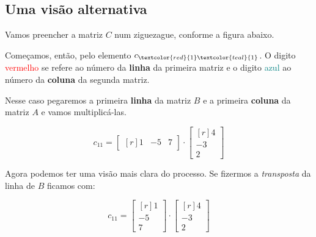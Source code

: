 \subsection{Uma visão alternativa}

Vamos preencher a matriz $C$ num ziguezague, conforme a figura abaixo.

\begin{center}
\end{center}

Começamos, então, pelo elemento $c_{\textcolor{red}{1}\textcolor{teal}{1}}$. O digito \textcolor{red}{vermelho} se refere ao número da \textbf{linha} da primeira matriz e o digito \textcolor{teal}{azul} ao número da \textbf{coluna} da segunda matriz.

Nesse caso pegaremos a primeira \textbf{linha} da matriz $B$ e a primeira \textbf{coluna} da matriz $A$ e vamos multiplicá-las.

$$
c_{11}=\begin{bmatrix*}[r]
1 & -5 & 7
\end{bmatrix*}\cdot\begin{bmatrix*}[r]
4 \\ -3 \\ 2
\end{bmatrix*}
$$

Agora podemos ter uma visão mais clara do processo. Se fizermos a \textit{transposta} da linha de $B$ ficamos com:

$$
c_{11}=\begin{bmatrix*}[r]
1 \\ -5 \\ 7
\end{bmatrix*}\cdot\begin{bmatrix*}[r]
4 \\ -3 \\ 2
\end{bmatrix*}
$$

